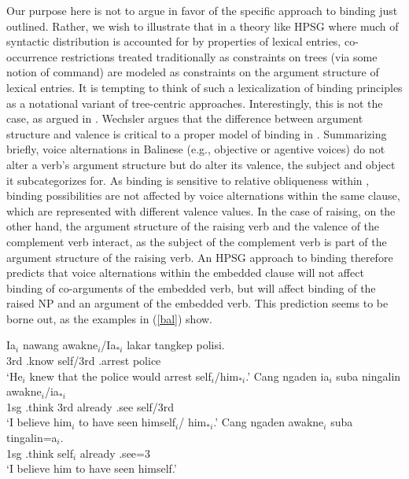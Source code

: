 \documentclass[output=paper]{langsci/langscibook}
\begin{document}
Our purpose here is not to argue in favor of the specific approach to binding just outlined. Rather, we wish to illustrate that in a theory like HPSG where much of syntactic distribution is accounted for by properties of lexical entries, co-occurrence restrictions treated traditionally as constraints on trees (via some notion of command) are modeled as constraints on the argument structure of lexical entries. It is tempting to think of such a lexicalization of binding principles as a notational variant of tree-centric approaches. Interestingly, this is not the case, as argued in . Wechsler argues that the difference between argument structure and valence is critical to a proper model of binding in . Summarizing briefly, voice alternations in Balinese  (e.g., objective or agentive voices) do not alter a verb's argument structure but do alter its valence, the subject and object it subcategorizes for. As binding is sensitive to relative obliqueness within , binding possibilities are not affected by voice alternations within the same clause, which are represented with different valence values. In the case of raising, on the other hand, the argument structure of the raising verb and the valence of the complement verb interact, as the subject of the complement verb is part of the argument structure of the raising verb. An HPSG approach to binding therefore predicts that voice alternations within the embedded clause will not affect binding of co-arguments of the embedded verb, but will affect binding of the raised NP and an argument of the embedded verb. This prediction seems to be borne out, as the  examples in (\ref{bal}) show. 

\begin{exe}
	\ex\label{bal}
	\begin{xlist} 
		\ex\label{bal-a}
		\gll Ia$_{i}$ nawang {awakne$_{i}$/Ia$_{*i}$ } lakar tangkep polisi. \\
		3rd .know self/3rd  .arrest police  \\
		\glt `He$_{i}$ knew that the police would arrest self$_{i}$/him$_{*i}$.'
		\ex\label{bal-b}
		\gll Cang ngaden ia$_{i}$ suba ningalin awakne$_{i}$/ia$_{*i}$ \\
		1sg .think 3rd already .see self/3rd \\
		\glt `I believe him$_{i}$ to have seen himself$_{i}$/ him$_{*i}$.'
		\ex\label{bal-c}
		\gll Cang ngaden awakne$_{i}$ suba tingalin=a$_{i}$.\\
		1sg .think self$_{i}$ already .see=3 \\
		\glt `I believe him to have seen himself.'
	\end{xlist}
\end{exe} 
\end{document}
